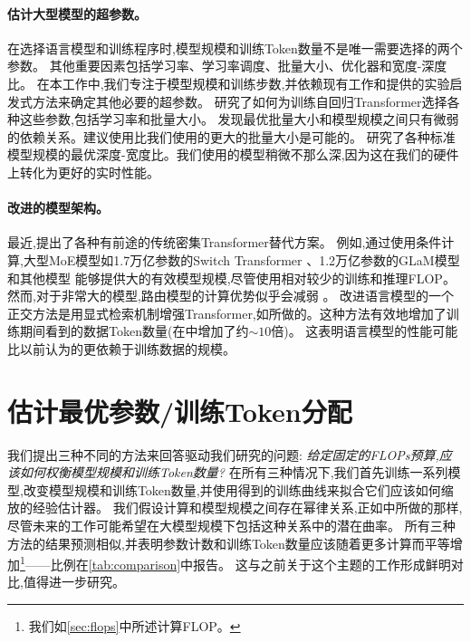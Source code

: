 \documentclass[11pt, a4paper, logo, copyright, nonumbering]{deepmind}
\begin{document}
\paragraph{估计大型模型的超参数。}
在选择语言模型和训练程序时,模型规模和训练Token数量不是唯一需要选择的两个参数。
其他重要因素包括学习率、学习率调度、批量大小、优化器和宽度-深度比。
在本工作中,我们专注于模型规模和训练步数,并依赖现有工作和提供的实验启发式方法来确定其他必要的超参数。
\citet{yang2021tuning}研究了如何为训练自回归Transformer选择各种这些参数,包括学习率和批量大小。
\citet{mccandlish2018empirical}发现最优批量大小和模型规模之间只有微弱的依赖关系。\citet{shallue2018measuring, NEURIPS2019_e0eacd98}建议使用比我们使用的更大的批量大小是可能的。
\citet{levine2020depth}研究了各种标准模型规模的最优深度-宽度比。我们使用的模型稍微不那么深,因为这在我们的硬件上转化为更好的实时性能。

\paragraph{改进的模型架构。}
最近,提出了各种有前途的传统密集Transformer替代方案。
例如,通过使用条件计算,大型MoE模型如1.7万亿参数的Switch Transformer \citep{fedus2021switch}、1.2万亿参数的GLaM模型 \citep{du2021glam}和其他模型 \citep{artetxe2021efficient, zoph2022designing}能够提供大的有效模型规模,尽管使用相对较少的训练和推理FLOP。
然而,对于非常大的模型,路由模型的计算优势似乎会减弱 \citep{clark2022unified}。
改进语言模型的一个正交方法是用显式检索机制增强Transformer,如\citet{borgeaud2021retrieval, guu2020realm, lewisretrieval2020}所做的。这种方法有效地增加了训练期间看到的数据Token数量(在\citet{borgeaud2021retrieval}中增加了约$\sim10$倍)。
这表明语言模型的性能可能比以前认为的更依赖于训练数据的规模。

\section{估计最优参数/训练Token分配}
\label{sec:method}
我们提出三种不同的方法来回答驱动我们研究的问题:
\textit{给定固定的FLOPs预算,应该如何权衡模型规模和训练Token数量?}
在所有三种情况下,我们首先训练一系列模型,改变模型规模和训练Token数量,并使用得到的训练曲线来拟合它们应该如何缩放的经验估计器。
我们假设计算和模型规模之间存在幂律关系,正如\citet{clark2022unified, kaplan2020scaling}中所做的那样,尽管未来的工作可能希望在大模型规模下包括这种关系中的潜在曲率。
所有三种方法的结果预测相似,并表明参数计数和训练Token数量应该随着更多计算而平等增加\footnote{我们如\autoref{sec:flops}中所述计算FLOP。}——比例在\autoref{tab:comparison}中报告。
这与之前关于这个主题的工作形成鲜明对比,值得进一步研究。
\end{document}
